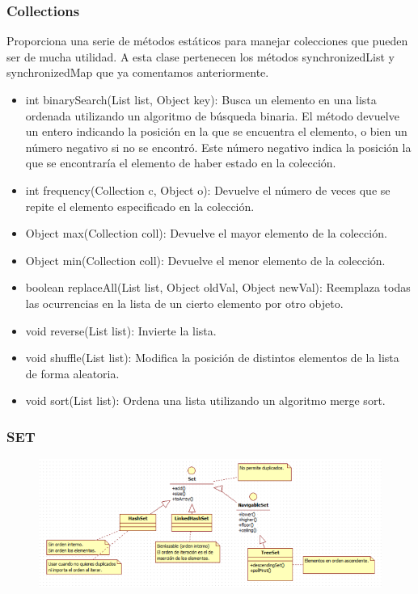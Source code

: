 \documentclass{beamer}
\begin{document}
\begin{frame}
\frametitle{Collections}
Proporciona una serie de métodos estáticos para manejar colecciones que pueden ser de mucha utilidad. A esta clase pertenecen los métodos synchronizedList y synchronizedMap que ya comentamos anteriormente.
\begin{footnotesize}
\begin{itemize}[<+->]
\item int binarySearch(List list, Object key): Busca un elemento en una lista ordenada utilizando un algoritmo de búsqueda binaria. El método devuelve un entero indicando la posición en la que se encuentra el elemento, o bien un número negativo si no se encontró. Este número negativo indica la posición la que se encontraría el elemento de haber estado en la colección.
\item int frequency(Collection c, Object o): Devuelve el número de veces que se repite el elemento especificado en la colección.
\item Object max(Collection coll): Devuelve el mayor elemento de la colección.
\item Object min(Collection coll): Devuelve el menor elemento de la colección.
\item boolean replaceAll(List list, Object oldVal, Object newVal): Reemplaza todas las ocurrencias en la lista de un cierto elemento por otro objeto.
\item void reverse(List list): Invierte la lista.
\item void shuffle(List list): Modifica la posición de distintos elementos de la lista de forma aleatoria.
\item void sort(List list): Ordena una lista utilizando un algoritmo merge sort.
\end{itemize}
\end{footnotesize}
\end{frame}



\begin{frame}
\frametitle{SET}
\begin{figure}
\includegraphics[scale=0.55]{imagenes/set.png}
\end{figure}
\end{frame}
\end{document}
